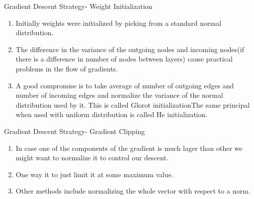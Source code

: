 \begin{frame}{Gradient Descent Strategy- Weight Initialization}
	\begin{enumerate}[$\bullet$]
		\item Initially weights were initialized by picking from a standard normal distribution.\pause
		\item The difference in the variance of the outgoing nodes and incoming nodes(if there is a difference in number of nodes between layers) cause practical problems in the flow of gradients.\pause
		\item A good compromise is to take average of number of outgoing edges and number of incoming edges and normalize the variance of the normal distribution used by it. This is called Glorot initialization\pause The same principal when used with uniform distribution is called He initialization.
	\end{enumerate}
\end{frame}

\begin{frame}{Gradient Descent Strategy- Gradient Clipping}
	\begin{enumerate}[$\bullet$]
		\item In case one of the components of the gradient is much lager than other we might want to normalize it to control our descent.\pause
		\item One way it to just limit it at some maximum value.\pause
		\item Other methods include normalizing the whole vector with respect to a norm. 
	\end{enumerate}
\end{frame}

